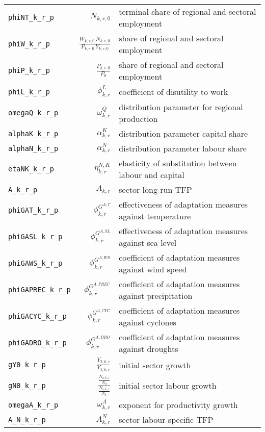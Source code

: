 \begin{center}
\begin{longtable}{lrl}
\texttt{phiNT\_k\_r\_p} & ${N_{k,r,0}}$ & terminal share of regional and sectoral employment\\
\texttt{phiW\_k\_r\_p} & $\frac{W_{k,r,0} \, N_{k,r,0}}{P_{k,r,0} \, Y_{k,r,0}}$ & share of regional and sectoral employment\\
\texttt{phiP\_k\_r\_p} & $\frac{P_{k,r,0}}{P_{0}}$ & share of regional and sectoral employment\\
\texttt{phiL\_k\_r\_p} & ${\phi^{L}_{k,r}}$ & coefficient of disutility to work\\
\texttt{omegaQ\_k\_r\_p} & ${\omega^{Q}_{k,r}}$ & distribution parameter for regional production\\
\texttt{alphaK\_k\_r\_p} & ${\alpha^{K}_{k,r}}$ & distribution parameter capital share\\
\texttt{alphaN\_k\_r\_p} & ${\alpha^{N}_{k,r}}$ & distribution parameter labour share\\
\texttt{etaNK\_k\_r\_p} & ${\eta^{N,K}_{k,r}}$ & elasticity of substitution between labour and capital\\
\texttt{A\_k\_r\_p} & ${A_{k,r}}$ & sector long-run TFP\\
\texttt{phiGAT\_k\_r\_p} & ${\phi^{G^{A,T}}_{k,r}}$ & effectiveness of adaptation measures against temperature\\
\texttt{phiGASL\_k\_r\_p} & ${\phi^{G^{A,SL}}_{k,r}}$ & effectiveness of adaptation measures against sea level\\
\texttt{phiGAWS\_k\_r\_p} & ${\phi^{G^{A,WS}}_{k,r}}$ & coefficient of adaptation measures against wind speed\\
\texttt{phiGAPREC\_k\_r\_p} & ${\phi^{G^{A,PREC}}_{k,r}}$ & coefficient of adaptation measures against precipitation\\
\texttt{phiGACYC\_k\_r\_p} & ${\phi^{G^{A,CYC}}_{k,r}}$ & coefficient of adaptation measures against cyclones\\
\texttt{phiGADRO\_k\_r\_p} & ${\phi^{G^{A,DRO}}_{k,r}}$ & coefficient of adaptation measures against droughts\\
\texttt{gY0\_k\_r\_p} & ${\frac{Y_{2,k,r}}{Y_{1,k,r}}}$ & initial sector growth\\
\texttt{gN0\_k\_r\_p} & $\frac{\frac{N_{2,k,r}}{N_{2}}}{\frac{N_{1,k,r}}{N_{1}}}$ & initial sector labour growth\\
\texttt{omegaA\_k\_r\_p} & ${\omega^{A}_{k,r}}$ & exponent for productivity growth\\
\texttt{A\_N\_k\_r\_p} & ${A^{N}_{k,r}}$ & sector labour specific TFP\\

\end{longtable}
\end{center}
